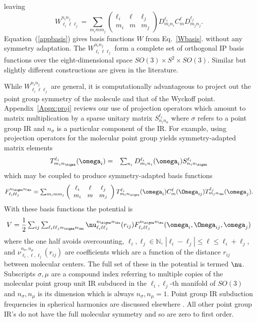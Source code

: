 \documentclass[preprint]{iucr}              %
\newcommand{\mb}[1]{\ensuremath{\mbox{\boldmath $ #1 $}}}
\begin{document}
leaving
\begin{equation}
\label{appbasis}W^{n_i n_j}_{\ell_i \ell
\ell_j}=\sum_{m_imm_j}\left(\begin{array}{ccc} \ell_i & \ell & \ell_j \\
m_i & m & m_j
\end{array}\right)D^{\ell_i}_{m_in_i}C^\ell_m D^{\ell_j}_{m_jn_j}.
\end{equation}
Equation~(\ref{appbasis}) gives basis functions $W$ from Eq.~\ref{Wbasis}.
without any
symmetry adaptation.  The $W^{n_i n_j}_{\ell_i \ell \ell_j}$ form a complete set
of orthogonal IP
basis functions over the eight-dimensional space $SO(3)\times
S^2\times SO(3)$. Similar but slightly different constructions are given in the literature.\cite{Avoird80,Briels80,Stone84,Avoird94}

While $W^{n_i n_j}_{\ell_i \ell \ell_j}$ are
general, it is computationally advantageous to project out
the point group symmetry of the molecule and that of the Wyckoff
point. Appendix~\ref{Appx:proj} reviews our use of projection
operators which amount to matrix multiplication by a sparse
unitary matrix $S^{\ell_i}_{n_in_\sigma}$ where $\sigma$ refers to
a point group IR and $n_\sigma$ is a particular component of the
IR. For example, using projection operators for the molecular
point group yields symmetry-adapted matrix elements
\begin{eqnarray}
\label{eq:Tfunc}T^{\ell_i}_{m_i n_\sigma}(\mb{\omega}_i)&=&\sum_{n_i}D_{m_i
n_i}^{\ell_i}(\mb{\omega}_i)S^{\ell_i}_{n_in_\sigma}
\end{eqnarray}
which may be coupled to produce symmetry-adapted basis functions
\begin{equation}
\label{basis}F_{\ell_i\ell\ell_j}^{n_\sigma
n_\mu}=\sum_{m_imm_j}\left(\begin{array}{ccc} \ell_i & \ell & \ell_j \\
m_i & m & m_j
\end{array}\right)T^{\ell_i}_{m_i n_\sigma}(\mb{\omega}_i)
C^\ell_m(\mb{\Omega}_{ij}) T^{\ell_j}_{m_j n_\mu}(\mb{\omega}_j).
\end{equation}
With these basis functions the potential is
\begin{equation}
\label{eq:vij} V = \frac{1}{2}\sum_{ij} \sum_{\ell_i \ell \ell_j
n_\sigma n_\mu} \nu_{\ell_i\ell\ell_j}^{n_\sigma n_\mu}(r_{ij})
F_{\ell_i\ell\ell_j}^{n_\sigma
n_\mu}(\mb{\omega}_i,\mb{\Omega}_{ij},\mb{\omega}_j)
\end{equation}
where the one half avoids overcounting,
$\ell_i,\ell_j\in\mathbb{N}$, $|\ell_i-\ell_j|\leq\ell\leq
\ell_i+\ell_j$, and
$\nu_{\ell_i,\ell,\ell_j}^{n_\sigma,n_\mu}(r_{ij})$ are
coefficients which are a function of the distance $r_{ij}$ between
molecular centers. The full set of these in the potential is
termed $\mb{\nu}$. Subscripts $\sigma,\mu$ are a compound index
referring to multiple copies of the molecular point group unit IR
subduced in the $\ell_i,\ell_j$-th manifold of $SO(3)$ and
$n_\sigma,n_\mu$ is its dimension which is always
$n_\sigma,n_\mu=1$.  Point group IR subduction frequencies in
spherical harmonics are discussed elsewhere \cite{Bradley72}. All
other point group IR's do not have the full molecular symmetry and
so are zero to first order.
\end{document}
